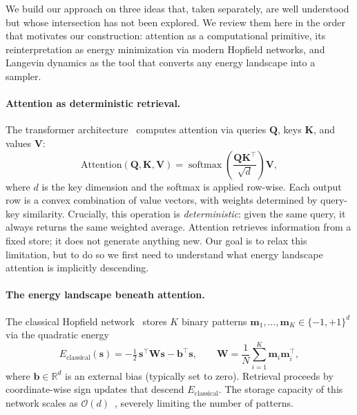 
We build our approach on three ideas that, taken separately, are well understood but whose intersection has not been explored. We review them here in the order that motivates our construction: attention as a computational primitive, its reinterpretation as energy minimization via modern Hopfield networks, and Langevin dynamics as the tool that converts any energy landscape into a sampler.

\paragraph{Attention as deterministic retrieval.}
The transformer architecture~\cite{vaswaniAttentionAllYou2017} computes attention via queries $\mathbf{Q}$, keys $\mathbf{K}$, and values $\mathbf{V}$:
\begin{equation}\label{eq:sdp-attention}
    \mathrm{Attention}(\mathbf{Q},\mathbf{K},\mathbf{V})
    = \operatorname{softmax}\!\left(\frac{\mathbf{Q}\mathbf{K}^{\top}}{\sqrt{d}}\right)\mathbf{V},
\end{equation}
where $d$ is the key dimension and the softmax is applied row-wise. Each output row is a convex combination of value vectors, with weights determined by query-key similarity.
Crucially, this operation is \emph{deterministic}: given the same query, it always returns the same weighted average. Attention retrieves information from a fixed store; it does not generate anything new. Our goal is to relax this limitation, but to do so we first need to understand what energy landscape attention is implicitly descending.

\paragraph{The energy landscape beneath attention.}
The classical Hopfield network~\cite{hopfieldNeuralNetworksPhysical1982} stores $K$ binary patterns $\mathbf{m}_1,\dots,\mathbf{m}_K\in\{-1,+1\}^d$ via the quadratic energy
\begin{equation}\label{eq:classical-hopfield}
    E_{\mathrm{classical}}(\mathbf{s})
    = -\tfrac{1}{2}\,\mathbf{s}^{\top}\mathbf{W}\mathbf{s}
      - \mathbf{b}^{\top}\mathbf{s},
    \qquad
    \mathbf{W} = \frac{1}{N}\sum_{i=1}^{K}\mathbf{m}_i\mathbf{m}_i^{\top},
\end{equation}
where $\mathbf{b}\in\mathbb{R}^d$ is an external bias (typically set to zero). Retrieval proceeds by coordinate-wise sign updates that descend $E_{\mathrm{classical}}$. The storage capacity of this network scales as $\mathcal{O}(d)$~\cite{amitStoringInfiniteNumbers1985}, severely limiting the number of patterns.

